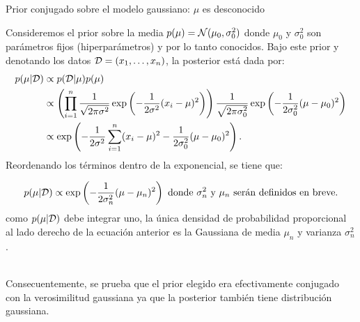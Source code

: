 \documentclass[9pt, handout]{beamer}
\begin{document}
\begin{frame}{Prior conjugado sobre el modelo gaussiano: $\mu$ es desconocido}

Consideremos el prior sobre la media $p(\mu) = {\mathcal N}(\mu_0,\sigma_0^2)$ donde $\mu_0$ y $\sigma^2_0$ son parámetros fijos (hiperparámetros) y por lo tanto conocidos. Bajo este prior y denotando los datos ${\mathcal D} = (x_1,\ldots,x_n)$, la posterior está dada por:
 \begin{align*}
 	p(\mu|{\mathcal D})& \propto p({\mathcal D}|\mu)p(\mu)\\
 	& \propto \left(\prod_{i=1}^n \frac{1}{\sqrt{2\pi\sigma^2}}\exp\left(-\frac{1}{2\sigma^2}(x_i-\mu)^2\right) \right)\frac{1}{\sqrt{2\pi\sigma_0^2}}\exp\left(-\frac{1}{2\sigma_0^2}(\mu-\mu_0)^2\right)\\
 	&\propto \exp\left(-\frac{1}{2\sigma^2}\sum_{i=1}^n(x_i-\mu)^2-\frac{1}{2\sigma_0^2}(\mu-\mu_0)^2\right).
 \end{align*} 
 \pause
 Reordenando los términos dentro de la exponencial, se tiene que:
 
 \begin{equation*}
 	p(\mu|{\mathcal D}) \propto \exp\left(-\frac{1}{2\sigma_n^2}(\mu - \mu_n)^2\right) \text{ donde $\sigma_n^2$ y $\mu_n$ serán definidos en breve.}
 	\end{equation*} 
\pause
como $p(\mu|{\mathcal D})$ debe integrar uno, la única densidad de probabilidad proporcional al lado derecho de la ecuación anterior es la Gaussiana de media $\mu_n$ y varianza $\sigma_n^2$.\\~\ \pause

Consecuentemente, se prueba que el prior elegido era efectivamente conjugado con la verosimilitud gaussiana ya que la posterior también tiene distribución gaussiana.

\end{frame}
\end{document}
